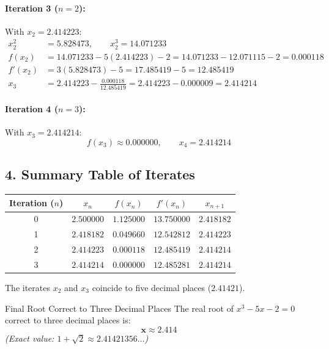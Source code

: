 \documentclass[11pt,a4paper]{article}
\begin{document}
\paragraph{Iteration 3 ($n = 2$):}
With $x_2 = 2.414223$:
\begin{align*}
x_2^2 &= 5.828473, \qquad x_2^3 = 14.071233 \\
f(x_2) &= 14.071233 - 5(2.414223) - 2 = 14.071233 - 12.071115 - 2 = 0.000118 \\
f'(x_2) &= 3(5.828473) - 5 = 17.485419 - 5 = 12.485419 \\
x_3 &= 2.414223 - \frac{0.000118}{12.485419} = 2.414223 - 0.000009 = \mathbf{2.414214}
\end{align*}

\paragraph{Iteration 4 ($n = 3$):}
With $x_3 = 2.414214$:
\[
f(x_3) \approx 0.000000, \qquad x_4 = \mathbf{2.414214}
\]

\subsection*{4. Summary Table of Iterates}

\begin{center}
\renewcommand{\arraystretch}{1.2}
\begin{tabular}{ccccc}
\toprule
\textbf{Iteration ($n$)} & $x_n$ & $f(x_n)$ & $f'(x_n)$ & $x_{n+1}$ \\
\midrule
0 & $2.500000$ & $1.125000$ & $13.750000$ & $2.418182$ \\
1 & $2.418182$ & $0.049660$ & $12.542812$ & $2.414223$ \\
2 & $2.414223$ & $0.000118$ & $12.485419$ & $2.414214$ \\
3 & $2.414214$ & $0.000000$ & $12.485281$ & $2.414214$ \\
\bottomrule
\end{tabular}
\end{center}

\vspace{6pt}
The iterates $x_2$ and $x_3$ coincide to five decimal places ($2.41421$).

\begin{answerbox}{Final Root Correct to Three Decimal Places}
The real root of $x^3 - 5x - 2 = 0$ correct to three decimal places is:
\begin{equation}
\mathbf{x \approx 2.414}
\end{equation}
\textit{(Exact value: $1 + \sqrt{2} \approx 2.41421356\dots$)}
\end{answerbox}
\end{document}
